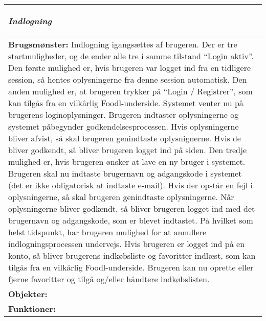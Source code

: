\begin{tabular}{p{\textwidth}}
    \hline
    \begin{center} 
    \textbf{\textit{Indlogning}} 
    \end{center} \\ \hline
    \textbf{Brugsmønster:} Indlogning igangsættes af brugeren. Der er tre startmuligheder, og de ender alle tre i samme tilstand “Login aktiv”. Den første mulighed er, hvis brugeren var logget ind fra en tidligere session, så hentes oplysningerne fra denne session automatisk. Den anden mulighed er, at brugeren trykker på “Login / Registrer”, som kan tilgås fra en vilkårlig Foodl-underside. Systemet venter nu på brugerens loginoplysninger. Brugeren indtaster oplysningerne og systemet påbegynder godkendelsesprocessen. Hvis oplysningerne bliver afvist, så skal brugeren genindtaste oplysnignerne. Hvis de bliver godkendt, så bliver brugeren logget ind på siden. Den tredje mulighed er, hvis brugeren ønsker at lave en ny bruger i systemet. Brugeren skal nu indtaste brugernavn og adgangskode i systemet (det er ikke obligatorisk at indtaste e-mail). Hvis der opstår en fejl i oplysningerne, så skal brugeren genindtaste oplysningerne. Når oplysningerne bliver godkendt, så bliver brugeren logget ind med det brugernavn og adgangskode, som er blevet indtastet. På hvilket som helst tidspunkt, har brugeren mulighed for at annullere indlogningsprocessen undervejs.
Hvis brugeren er logget ind på en konto, så bliver brugerens indkøbsliste og favoritter indlæst, som kan tilgås fra en vilkårlig Foodl-underside. Brugeren kan nu oprette eller fjerne favoritter og tilgå og/eller håndtere indkøbslisten. \\
    \textbf{Objekter:}  \\
    \textbf{Funktioner:}  \\ \hline
\end{tabular}
